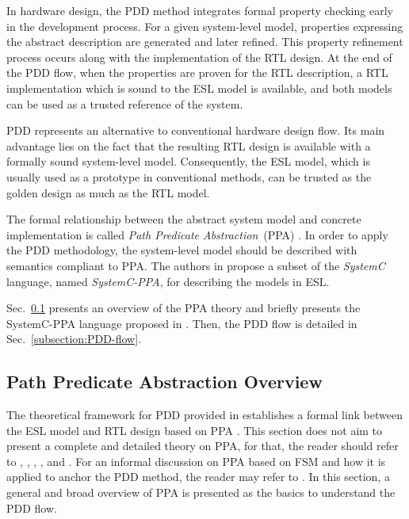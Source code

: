 In hardware design, the PDD method integrates formal property checking early in the development process. For a given system-level model, properties expressing the abstract description are generated and later refined. This property refinement process occurs along with the implementation of the RTL design. At the end of the PDD flow, when the properties are proven for the RTL description, a RTL implementation which is sound to the ESL model is available, and both models can be used as a trusted reference of the system.

PDD represents an alternative to conventional hardware design flow. Its main advantage lies on the fact that the resulting RTL design is available with a formally sound system-level model. Consequently, the ESL model, which is usually used as a prototype in conventional methods, can be trusted as the golden design as much as the RTL model. 

The formal relationship between the abstract system model and concrete implementation is called \textit{Path Predicate Abstraction}~(PPA) \cite{paper-ppa}. In order to apply the PDD methodology, the system-level model should be described with semantics compliant to PPA. The authors in \cite{paper-pdd} propose a subset of the \textit{SystemC} language, named \textit{SystemC-PPA}, for describing the models in ESL.

Sec.~\ref{subsection:PPA} presents an overview of the PPA theory and briefly presents the SystemC-PPA language proposed in \cite{paper-pdd}. Then, the PDD flow is detailed in Sec.~\ref{subsection:PDD-flow}.

\subsection{Path Predicate Abstraction Overview}
\label{subsection:PPA}

The theoretical framework for PDD provided in \cite{paper-pdd} establishes a formal link between the ESL model and RTL design based on PPA \cite{paper-ppa}. This section does not aim to present a complete and detailed theory on PPA, for that, the reader should refer to \cite{paper-ppa}, \cite{ppa2}, \cite{ppa3}, \cite{ppa4}, and \cite{ppa5}. For an informal discussion on PPA based on FSM and how it is applied to anchor the PDD method, the reader may refer to \cite{paper-pdd}. In this section, a general and broad overview of PPA is presented as the basics to understand the PDD flow.

